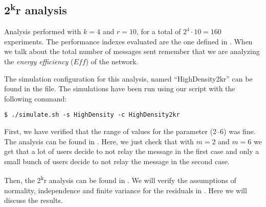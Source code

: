 \subsection{2\texorpdfstring{\textsuperscript{k}}{k}r analysis}\label{subsec:hd2kr}

Analysis performed with \(k\!=\!4\) and \(r\!=\!10\), for a total of \(2^4 \cdot
10 \!=\!160\) experiments. The performance indexes evaluated are the one defined
in . When we talk about the total number of messages sent
remember that we are analyzing the \emph{energy efficiency} (\(\mathit{Eff}\))
of the network.

The simulation configuration for this analysis, named ``HighDensity2kr'' can be
found in the  file. The simulations have been run using
our  script with the following command:
\begin{verbatim}
$ ./simulate.sh -s HighDensity -c HighDensity2kr
\end{verbatim}

First, we have verified that the range of values for the 
parameter (2--6) was fine. The analysis can be found in .
Here, we just check that with \(m\!=\!2\) and \(m\!=\!6\) we get that a lot of
users decide to not relay the message in the first case and only a small bunch
of users decide to not relay the message in the second case.

Then, the 2\textsuperscript{k}r analysis can be found in . We
will verify the assumptions of normality, independence and finite variance for
the residuals in . Here we will discuss the
results.





